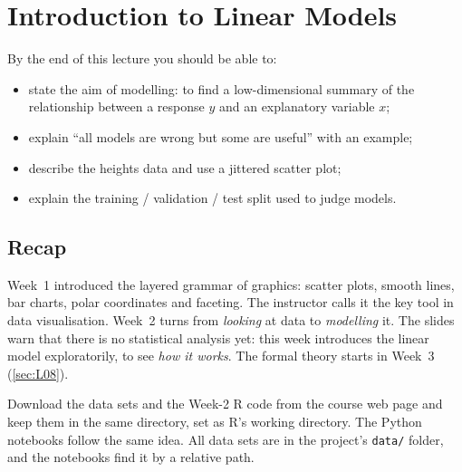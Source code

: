 \section{Introduction to Linear Models}\label{sec:L04}


\begin{guiding*}
By the end of this lecture you should be able to:
\begin{itemize}
  \item state the aim of modelling: to find a low-dimensional summary of the relationship between a response $y$ and an explanatory variable $x$;
  \item explain ``all models are wrong but some are useful'' with an example;
  \item describe the heights data and use a jittered scatter plot;
  \item explain the training / validation / test split used to judge models.
\end{itemize}
\end{guiding*}

\subsection{Recap}
Week~1 introduced the layered grammar of graphics: scatter plots, smooth lines, bar charts,
polar coordinates and faceting. The instructor calls it the key tool in data visualisation.
Week~2 turns from \emph{looking} at data to \emph{modelling} it. The slides warn that there is
no statistical analysis yet: this week introduces the linear model exploratorily, to see
\emph{how it works}. The formal theory starts in Week~3 (\cref{sec:L08}).

\begin{note}
Download the data sets and the Week-2 R code from the course web page and keep them in the same
directory, set as R's working directory. The Python notebooks follow the same idea. All data
sets are in the project's \texttt{data/} folder, and the notebooks find it by a relative path.
\end{note}

